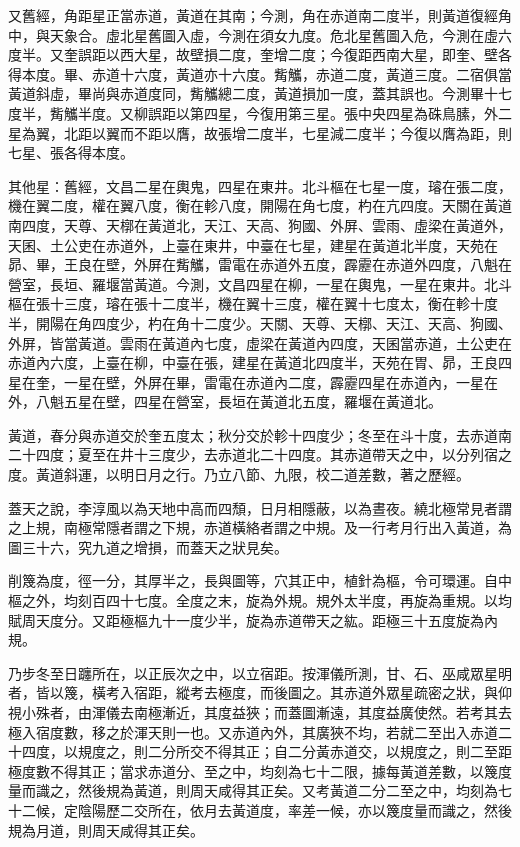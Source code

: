 \begin{pinyinscope}
 又舊經，角距星正當赤道，黃道在其南；今測，角在赤道南二度半，則黃道復經角中，與天象合。虛北星舊圖入虛，今測在須女九度。危北星舊圖入危，今測在虛六度半。又奎誤距以西大星，故壁損二度，奎增二度；今復距西南大星，即奎、壁各得本度。畢、赤道十六度，黃道亦十六度。觜觿，赤道二度，黃道三度。二宿俱當黃道斜虛，畢尚與赤道度同，觜觿總二度，黃道損加一度，蓋其誤也。今測畢十七度半，觜觿半度。又柳誤距以第四星，今復用第三星。張中央四星為硃鳥膆，外二星為翼，北距以翼而不距以膺，故張增二度半，七星減二度半；今復以膺為距，則七星、張各得本度。



 其他星：舊經，文昌二星在輿鬼，四星在東井。北斗樞在七星一度，璿在張二度，機在翼二度，權在翼八度，衡在軫八度，開陽在角七度，杓在亢四度。天關在黃道南四度，天尊、天槨在黃道北，天江、天高、狗國、外屏、雲雨、虛梁在黃道外，天囷、土公吏在赤道外，上臺在東井，中臺在七星，建星在黃道北半度，天苑在昴、畢，王良在壁，外屏在觜觿，雷電在赤道外五度，霹靂在赤道外四度，八魁在營室，長垣、羅堰當黃道。今測，文昌四星在柳，一星在輿鬼，一星在東井。北斗樞在張十三度，璿在張十二度半，機在翼十三度，權在翼十七度太，衡在軫十度半，開陽在角四度少，杓在角十二度少。天關、天尊、天槨、天江、天高、狗國、外屏，皆當黃道。雲雨在黃道內七度，虛梁在黃道內四度，天囷當赤道，土公吏在赤道內六度，上臺在柳，中臺在張，建星在黃道北四度半，天苑在胃、昴，王良四星在奎，一星在壁，外屏在畢，雷電在赤道內二度，霹靂四星在赤道內，一星在外，八魁五星在壁，四星在營室，長垣在黃道北五度，羅堰在黃道北。



 黃道，春分與赤道交於奎五度太；秋分交於軫十四度少；冬至在斗十度，去赤道南二十四度；夏至在井十三度少，去赤道北二十四度。其赤道帶天之中，以分列宿之度。黃道斜運，以明日月之行。乃立八節、九限，校二道差數，著之歷經。



 蓋天之說，李淳風以為天地中高而四頹，日月相隱蔽，以為晝夜。繞北極常見者謂之上規，南極常隱者謂之下規，赤道橫絡者謂之中規。及一行考月行出入黃道，為圖三十六，究九道之增損，而蓋天之狀見矣。



 削篾為度，徑一分，其厚半之，長與圖等，穴其正中，植針為樞，令可環運。自中樞之外，均刻百四十七度。全度之末，旋為外規。規外太半度，再旋為重規。以均賦周天度分。又距極樞九十一度少半，旋為赤道帶天之紘。距極三十五度旋為內規。



 乃步冬至日躔所在，以正辰次之中，以立宿距。按渾儀所測，甘、石、巫咸眾星明者，皆以篾，橫考入宿距，縱考去極度，而後圖之。其赤道外眾星疏密之狀，與仰視小殊者，由渾儀去南極漸近，其度益狹；而蓋圖漸遠，其度益廣使然。若考其去極入宿度數，移之於渾天則一也。又赤道內外，其廣狹不均，若就二至出入赤道二十四度，以規度之，則二分所交不得其正；自二分黃赤道交，以規度之，則二至距極度數不得其正；當求赤道分、至之中，均刻為七十二限，據每黃道差數，以篾度量而識之，然後規為黃道，則周天咸得其正矣。又考黃道二分二至之中，均刻為七十二候，定陰陽歷二交所在，依月去黃道度，率差一候，亦以篾度量而識之，然後規為月道，則周天咸得其正矣。




\end{pinyinscope}
